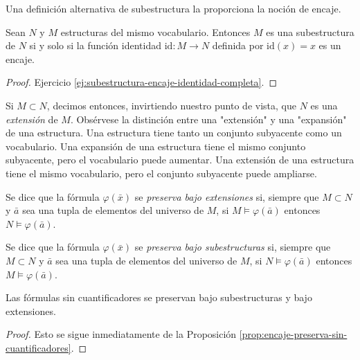 \documentclass[12pt,a4paper]{book}
\newcommand{\comillas}[1]{"#1"}
\begin{document}
    Una definición alternativa de subestructura la proporciona la noción de encaje.

    \begin{proposicion}\label{prop:subestructura-encaje-identidad}
        Sean $N$ y $M$ estructuras del mismo vocabulario. Entonces $M$ es una subestructura de $N$ si y solo si la función
        identidad $\mathrm{id}:M\rightarrow N$ definida por $\mathrm{id}(x)=x$ es un encaje.
    \end{proposicion}
    \begin{proof}
        Ejercicio \ref{ej:subestructura-encaje-identidad-completa}.
    \end{proof}

    Si $M\subset N$, decimos entonces, invirtiendo nuestro punto de vista, que $N$ es una \textit{extensión} de $M$.
    Obsérvese la distinción entre una \comillas{extensión} y una \comillas{expansión} de una estructura. Una estructura
    tiene tanto un conjunto subyacente como un vocabulario. Una expansión de una estructura tiene el mismo conjunto
    subyacente, pero el vocabulario puede aumentar. Una extensión de una estructura tiene el mismo vocabulario, pero el
    conjunto subyacente puede ampliarse.

    \begin{definicion}\label{def:preservada-extensiones}
        Se dice que la fórmula $\varphi(\bar{x})$ se \textit{preserva bajo extensiones} si, siempre que $M\subset N$ y
        $\bar{a}$ sea una tupla de elementos del universo de $M$, si $M\models\varphi(\bar{a})$ entonces
        $N\models\varphi(\bar{a})$.
    \end{definicion}

    \begin{definicion}\label{def:preservada-subestructuras}
        Se dice que la fórmula $\varphi(\bar{x})$ se \textit{preserva bajo subestructuras} si, siempre que $M\subset N$ y
        $\bar{a}$ sea una tupla de elementos del universo de $M$, si $N\models\varphi(\bar{a})$ entonces
        $M\models\varphi(\bar{a})$.
    \end{definicion}

    \begin{proposicion}\label{prop:sin-cuantificadores-preservada}
        Las fórmulas sin cuantificadores se preservan bajo subestructuras y bajo extensiones.
    \end{proposicion}
    \begin{proof}
        Esto se sigue inmediatamente de la Proposición \ref{prop:encaje-preserva-sin-cuantificadores}.
    \end{proof}
\end{document}
